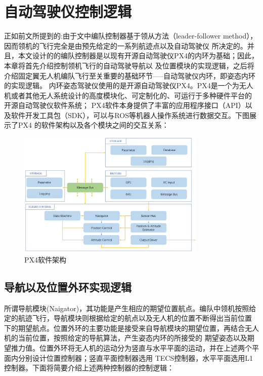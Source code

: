 \section{自动驾驶仪控制逻辑}
正如前文所提到的:由于文中编队控制器基于领从方法（leader-follower method），因而领机的飞行完全是由预先给定的一系列航迹点以及自动驾驶仪
所决定的。并且，本文设计的的编队控制器是以现有开源自动驾驶仪PX4的内环为基础；因此，本章将首先介绍控制领机飞行的自动驾驶导航以
及位置模块的实现逻辑，之后将介绍固定翼无人机编队飞行至关重要的基础环节-----自动驾驶仪内环，即姿态内环的实现逻辑。
内环姿态驾驶仪使用的是开源自动驾驶仪PX4。PX4是一个为无人机或者其他无人系统设计的高度模块化、可定制化的、可运行于多种硬件平台的
开源自动驾驶仪软件系统；
PX4软件本身提供了丰富的应用程序接口（API）以及软件开发工具包（SDK），可以与ROS等机器人操作系统进行数据交互。下图展示了PX4
的软件架构以及各个模块之间的交互关系：
\begin{figure}[H]
    \centering
    \includegraphics[width=0.8\textwidth]{figures/c4/PX4_archticher.png}
    \caption{PX4软件架构}\label{fig:PX4_archticher.png}
\end{figure}
\subsection{导航以及位置外环实现逻辑}
所谓导航模块(Naigator)，其功能是产生相应的期望位置航点。编队中领机按照给定的航迹飞行，导航模块则根据给定的航点以及无人机的位置不断得出当前位置
下的期望航点。位置外环的主要功能是接受来自导航模块的期望位置，再结合无人机的当前位置，按照给定的导航算法，产生姿态内环的所接受的
期望姿态以及期望推力值。位置外环将无人机的运动分为竖直与水平平面的运动，并在上述两个平面内分别设计位置控制器；竖直平面控制器选用
TECS控制器，水平平面选用L1控制器。下面将简要介绍上述两种控制器的控制逻辑：

